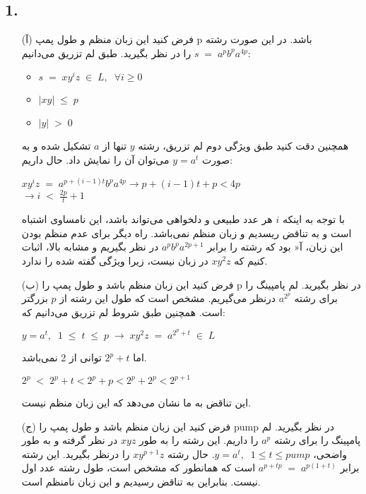 \subsection*{1. }
\begin{itemize}
    \item[(آ)]
    فرض کنید این زبان منظم و طول پمپ p باشد. در این صورت رشته
    $s \;=\; a^pb^pa^{4p}$ را در نظر بگیرید.
    \newline
    طبق لم تزریق می‌دانیم:
    \begin{itemize}
        \item $s\;=\;xy^iz \; \in \; L, \;\; \forall i \geq 0$\\
        \item $|xy| \; \leq \; p$\\
        \item $|y|\; > \; 0$\\[0.1in]
    \end{itemize}
    همچنین دقت کنید طبق ویژگی دوم لم تزریق، رشته $y$ تنها از $a$ تشکیل شده و به صورت
    $y = a^t$ می‌توان آن را نمایش داد.\newline
    حال داریم:
    \begin{center}
        $xy^iz \;=\; a^{p+(i-1)t}b^pa^{4p} \rightarrow 
        p+(i-1)t + p < 4p$ \\[0.05in]
        $\rightarrow i\;<\;\frac{2p}{t} + 1$\\[0.1in]
    \end{center}
    با توجه به اینکه $i$ هر عدد طبیعی و دلخواهی می‌تواند باشد، این نامساوی اشتباه است و به تناقض ریسدیم و زبان منظم نمی‌باشد. راه دیگر برای عدم منظم بودن این زبان، آ« بود که رشته را برابر $a^pb^pa^{2p+1}$ در نظر بگیریم و مشابه بالا، اثبات کنیم که
    $xy^2z$ در زبان نیست، زیرا ویژگی‌ گفته شده را ندارد.

    \item[(ب)]
    فرض کنید این زبان منظم باشد و طول پمپ را p در نظر بگیرید. لم پامپینگ را برای رشته
    $a^{2^p}$ درنظر می‌گیریم.
    مشخص است که طول این رشته از $p$ بزرگتر است. همچنین طبق شروط لم تزریق می‌دانیم که:
    \begin{center}
        $y = a^t,\;\; 1\; \leq \; t \;\leq \; p\;
        \rightarrow \; xy^2z \;=\;a^{2^p+t} \;\in\;L$
    \end{center}
    اما $2^p+t$ توانی از 2 نمی‌باشد.
    \begin{center}
        $2^p\;<\;2^p + t < 2^p + p < 2^p + 2^p < 2^{p+1}$
    \end{center}
    این تناقض به ما نشان می‌دهد که این زبان منظم نیست.

    \item[(ج)]
    فرض کنید این زبان منظم باشد و طول پمپ را pump در نظر بگیرید. لم پامپینگ را برای رشته
    $a^p$ را داریم. این رشته را به طور
    $xyz$ در نظر گرفته و به طور واضحی،
    $y = a^t, \;\;1 \leq t\leq pump$.
    حال رشته 
    $xy^{p+1}z$ را درنظر بگیرید.
    این رشته برابر 
    $a^{p+tp}\;=\;a^{p(1+t)}$ است که همانطور که مشخص است،
    طول رشته عدد اول نیست. بنابراین به تناقض رسیدیم و این زبان نامنظم است.
\end{itemize}

